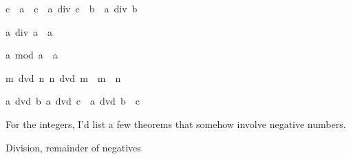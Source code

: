 \begin{isabellebody}
\begin{isamarkuptext}
\begin{isabelle}%
c\ {}\ {}{}{}{}a{}\ {}\ c\ {}\ a\ div\ {}c\ {}\ b{}\ {}\ a\ div\ b%
\end{isabelle}

\begin{isabelle}%
a\ div\ {}{}{}{}a{}\ {}\ {}{}{}{}a{}%
\end{isabelle}

\begin{isabelle}%
a\ mod\ {}{}{}{}a{}\ {}\ a%
\end{isabelle}

\begin{isabelle}%
{}m\ dvd\ n{}\ n\ dvd\ m{}\ {}\ m\ {}\ n%
\end{isabelle}

\begin{isabelle}%
{}a\ dvd\ b{}\ a\ dvd\ c{}\ {}\ a\ dvd\ b\ {}\ c%
\end{isabelle}

For the integers, I'd list a few theorems that somehow involve negative 
numbers.%
\end{isamarkuptext}%
\isamarkuptrue%
%
\begin{isamarkuptext}%
Division, remainder of negatives



\end{isamarkuptext}
\end{isabellebody}
